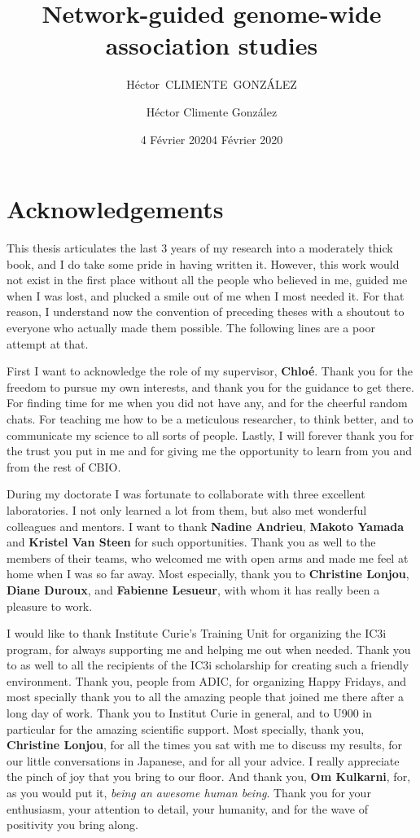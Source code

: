 \documentclass[
  11pt,
]{env/yjiao}
\author{\mbox{Héctor CLIMENTE GONZÁLEZ}}
\institute{MINES ParisTech}
\date{4 Février 2020}
\title{Network-guided genome-wide association studies}
\author{Héctor Climente González}
\date{4 Février 2020}
\begin{document}
\maketitle

{
\setcounter{tocdepth}{3}
\tableofcontents
}
\listoftables
\listoffigures
{}
\hypertarget{acknowledgements}{%
\chapter*{Acknowledgements}\label{acknowledgements}}

This thesis articulates the last 3 years of my research into a moderately thick book, and I do take some pride in having written it. However, this work would not exist in the first place without all the people who believed in me, guided me when I was lost, and plucked a smile out of me when I most needed it. For that reason, I understand now the convention of preceding theses with a shoutout to everyone who actually made them possible. The following lines are a poor attempt at that.

First I want to acknowledge the role of my supervisor, \textbf{Chloé}. Thank you for the freedom to pursue my own interests, and thank you for the guidance to get there. For finding time for me when you did not have any, and for the cheerful random chats. For teaching me how to be a meticulous researcher, to think better, and to communicate my science to all sorts of people. Lastly, I will forever thank you for the trust you put in me and for giving me the opportunity to learn from you and from the rest of CBIO.

During my doctorate I was fortunate to collaborate with three excellent laboratories. I not only learned a lot from them, but also met wonderful colleagues and mentors. I want to thank \textbf{Nadine Andrieu}, \textbf{Makoto Yamada} and \textbf{Kristel Van Steen} for such opportunities. Thank you as well to the members of their teams, who welcomed me with open arms and made me feel at home when I was so far away. Most especially, thank you to \textbf{Christine Lonjou}, \textbf{Diane Duroux}, and \textbf{Fabienne Lesueur}, with whom it has really been a pleasure to work.

I would like to thank Institute Curie's Training Unit for organizing the IC3i program, for always supporting me and helping me out when needed. Thank you to as well to all the recipients of the IC3i scholarship for creating such a friendly environment. Thank you, people from ADIC, for organizing Happy Fridays, and most specially thank you to all the amazing people that joined me there after a long day of work. Thank you to Institut Curie in general, and to U900 in particular for the amazing scientific support. Most specially, thank you, \textbf{Christine Lonjou}, for all the times you sat with me to discuss my results, for our little conversations in Japanese, and for all your advice. I really appreciate the pinch of joy that you bring to our floor. And thank you, \textbf{Om Kulkarni}, for, as you would put it, \emph{being an awesome human being}. Thank you for your enthusiasm, your attention to detail, your humanity, and for the wave of positivity you bring along.
\end{document}
